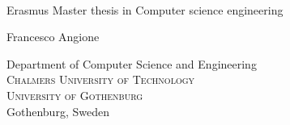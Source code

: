 
\begin{titlepage}
			
\addtolength{\voffset}{2cm}

\begin{figure}
\centering
\vspace{1cm}	%
\end{figure}

\mbox{}
\vfill
\renewcommand{\familydefault}{\sfdefault} \normalfont %

\textbf{\Huge  \multiLineTitle{0.2cm}}\\[0.5cm]



Erasmus Master thesis in Computer science engineering \setlength{\parskip}{1cm}

{\Large Francesco Angione} \setlength{\parskip}{2.9cm}

Department of Computer Science and Engineering \\
\textsc{Chalmers University of Technology} \\
\textsc{University of Gothenburg} \\
Gothenburg, Sweden \the\year

\renewcommand{\familydefault}{\rmdefault} \normalfont %
\end{titlepage}


\newpage
\restoregeometry
\thispagestyle{empty}
\mbox{}


